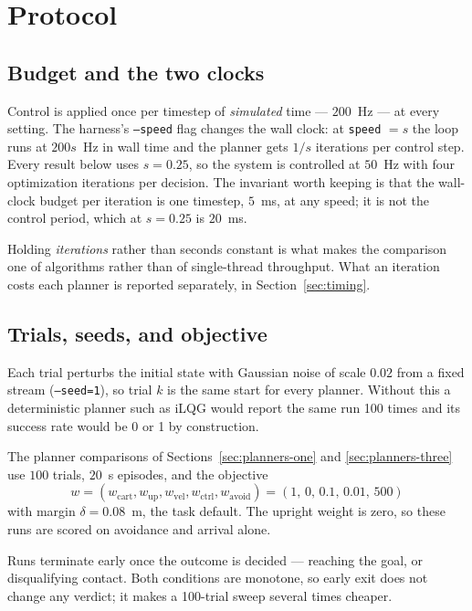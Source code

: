 \documentclass[conference]{IEEEtran}
\newcounter{algo}
\begin{document}
\section{Protocol}

\subsection{Budget and the two clocks}

Control is applied once per timestep of \emph{simulated} time --- $200$~Hz --- at
every setting. The harness's \texttt{--speed} flag changes the wall clock: at
\texttt{speed} $= s$ the loop runs at $200s$~Hz in wall time and the planner gets
$1/s$ iterations per control step. Every result below uses $s = 0.25$, so the
system is controlled at $50$~Hz with four optimization iterations per decision.
The invariant worth keeping is that the wall-clock budget per iteration is one
timestep, $5$~ms, at any speed; it is not the control period, which at
$s = 0.25$ is $20$~ms.

Holding \emph{iterations} rather than seconds constant is what makes the
comparison one of algorithms rather than of single-thread throughput. What an
iteration costs each planner is reported separately, in
Section~\ref{sec:timing}.

\subsection{Trials, seeds, and objective}

Each trial perturbs the initial state with Gaussian noise of scale $0.02$ from a
fixed stream (\texttt{--seed=1}), so trial $k$ is the same start for every
planner. Without this a deterministic planner such as iLQG would report the same
run 100 times and its success rate would be 0 or 1 by construction.

The planner comparisons of Sections~\ref{sec:planners-one} and
\ref{sec:planners-three} use $100$ trials, $20$~s episodes, and the objective
\begin{equation}
w = (w_{\text{cart}}, w_{\text{up}}, w_{\text{vel}}, w_{\text{ctrl}},
     w_{\text{avoid}}) = (1,\, 0,\, 0.1,\, 0.01,\, 500)
\label{eq:baseline-weights}
\end{equation}
with margin $\delta = 0.08$~m, the task default. The upright weight is zero, so
these runs are scored on avoidance and arrival alone.

Runs terminate early once the outcome is decided --- reaching the goal, or
disqualifying contact. Both conditions are monotone, so early exit does not
change any verdict; it makes a 100-trial sweep several times cheaper.
\end{document}
